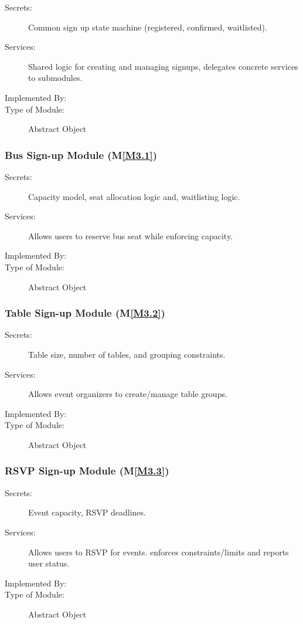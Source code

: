 \documentclass[12pt, titlepage]{article}
\newcommand{\mref}[1]{M\ref{#1}}
\begin{document}
\begin{description}
\item[Secrets:] Common sign up state machine (registered, confirmed, waitlisted).
\item[Services:] Shared logic for creating and managing signups, delegates concrete services to submodules.  
\item[Implemented By:] \progname{}
\item[Type of Module:] Abstract Object
\end{description}

\subsubsection{Bus Sign-up Module (\mref{M3.1})}

\begin{description}
\item[Secrets:] Capacity model, seat allocation logic and, waitlisting logic.
\item[Services:] Allows users to reserve bus seat while enforcing capacity.
\item[Implemented By:] \progname{}
\item[Type of Module:] Abstract Object
\end{description}

\subsubsection{Table Sign-up Module (\mref{M3.2})}

\begin{description}
\item[Secrets:] Table size, number of tables, and grouping constraints.
\item[Services:] Allows event organizers to create/manage table groups.
\item[Implemented By:] \progname{}
\item[Type of Module:] Abstract Object
\end{description}

\subsubsection{RSVP Sign-up Module (\mref{M3.3})}

\begin{description}
\item[Secrets:] Event capacity, RSVP deadlines. 
\item[Services:] Allows users to RSVP for events. enforces constraints/limits and reports user status.
\item[Implemented By:] \progname{}
\item[Type of Module:] Abstract Object
\end{description}
\end{document}
